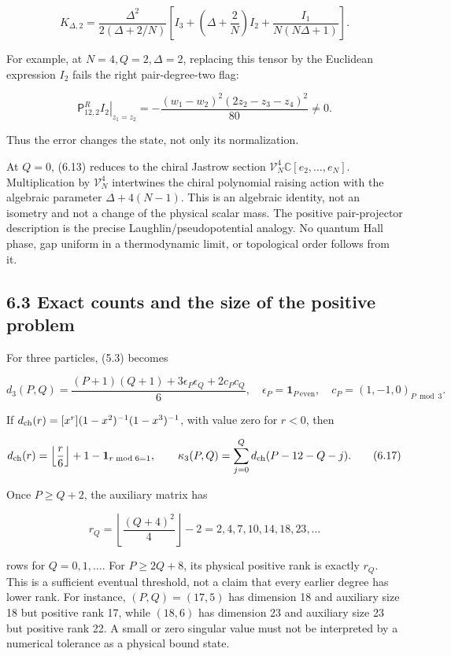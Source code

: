 \documentclass[a4paper,11pt]{article}
\numberwithin{equation}{section}
\begin{document}
\[
K_{\Delta,2}=
\frac{\Delta^2}{2(\Delta+2/N)}
\left[I_3+\left(\Delta+\frac2N\right)I_2
+\frac{I_1}{N(N\Delta+1)}\right].
\tag{6.14}
\]

For example, at \(N=4,Q=2,\Delta=2\), replacing this tensor by the Euclidean expression \(I_2\) fails the right pair-degree-two flag:

\[
\left.\mathsf P^R_{12,2}I_2\right|_{z_1=z_2}
=-\frac{(w_1-w_2)^2(2z_2-z_3-z_4)^2}{80}\ne0.
\tag{6.15}
\]

Thus the error changes the state, not only its normalization.

At \(Q=0\), (6.13) reduces to the chiral Jastrow section \(\mathcal V_N^4\mathbb C[e_2,\ldots,e_N]\). Multiplication by \(\mathcal V_N^4\) intertwines the chiral polynomial raising action with the algebraic parameter \(\Delta+4(N-1)\). This is an algebraic identity, not an isometry and not a change of the physical scalar mass. The positive pair-projector description is the precise Laughlin/pseudopotential analogy. No quantum Hall phase, gap uniform in a thermodynamic limit, or topological order follows from it.

\hypertarget{exact-counts-and-the-size-of-the-positive-problem}{%
\subsection{6.3 Exact counts and the size of the positive problem}\label{exact-counts-and-the-size-of-the-positive-problem}}

For three particles, (5.3) becomes

\[
d_3(P,Q)=\frac{(P+1)(Q+1)+3\epsilon_P\epsilon_Q+2c_Pc_Q}{6},
\quad
\epsilon_P=\mathbf1_{P\ \mathrm{even}},\quad c_P=(1,-1,0)_{P\bmod3}.
\tag{6.16}
\]

If \(d_{\rm ch}(r)=[x^r](1-x^2)^{-1}(1-x^3)^{-1}\), with value zero for \(r<0\), then

\[
d_{\rm ch}(r)=\left\lfloor\frac r6\right\rfloor+1-\mathbf1_{r\bmod6=1},
\qquad
\kappa_3(P,Q)=\sum_{j=0}^Qd_{\rm ch}(P-12-Q-j).
\tag{6.17}
\]

Once \(P\ge Q+2\), the auxiliary matrix has

\[
r_Q=\left\lfloor\frac{(Q+4)^2}{4}\right\rfloor-2
=2,4,7,10,14,18,23,\ldots
\tag{6.18}
\]

rows for \(Q=0,1,\ldots\). For \(P\ge2Q+8\), its physical positive rank is exactly \(r_Q\). This is a sufficient eventual threshold, not a claim that every earlier degree has lower rank. For instance, \((P,Q)=(17,5)\) has dimension 18 and auxiliary size 18 but positive rank 17, while \((18,6)\) has dimension 23 and auxiliary size 23 but positive rank 22. A small or zero singular value must not be interpreted by a numerical tolerance as a physical bound state.
\end{document}
